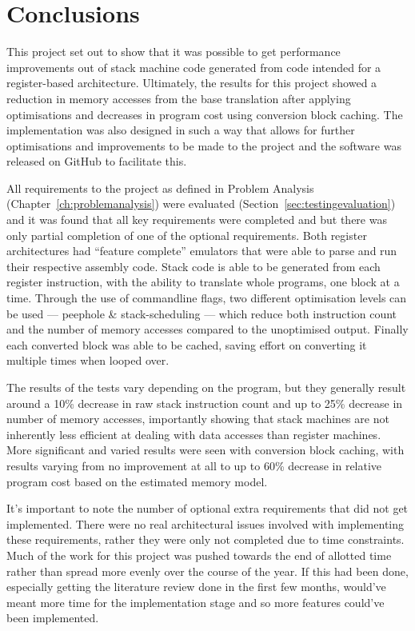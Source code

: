 \chapter{Conclusions}\label{ch:conclusions}
This project set out to show that it was possible to get performance
improvements out of stack machine code generated from code intended for a
register-based architecture. Ultimately, the results for this project showed a
reduction in memory accesses from the base translation after applying
optimisations and decreases in program cost using conversion block caching. The
implementation was also designed in such a way that allows for further
optimisations and improvements to be made to the project and the software was
released on GitHub to facilitate this.

All requirements to the project as defined in Problem Analysis
(Chapter~\ref{ch:problemanalysis}) were evaluated
(Section~\ref{sec:testingevaluation}) and it was found that all key requirements
were completed and but there was only partial completion of one of the optional
requirements. Both register architectures had ``feature complete'' emulators
that were able to parse and run their respective assembly code. Stack code is
able to be generated from each register instruction, with the ability to
translate whole programs, one block at a time. Through the use of commandline
flags, two different optimisation levels can be used --- peephole \&
stack-scheduling --- which reduce both instruction count and the number of
memory accesses compared to the unoptimised output.  Finally each converted
block was able to be cached, saving effort on converting it multiple times when
looped over.

The results of the tests vary depending on the program, but they generally
result around a 10\% decrease in raw stack instruction count and up to 25\%
decrease in number of memory accesses, importantly showing that stack machines
are not inherently less efficient at dealing with data accesses than register
machines. More significant and varied results were seen with conversion block
caching, with results varying from no improvement at all to up to 60\% decrease
in relative program cost based on the estimated memory model.

It's important to note the number of optional extra requirements that did not
get implemented. There were no real architectural issues involved with
implementing these requirements, rather they were only not completed due to time
constraints. Much of the work for this project was pushed towards the end of
allotted time rather than spread more evenly over the course of the year. If
this had been done, especially getting the literature review done in the first
few months, would've meant more time for the implementation stage and so more
features could've been implemented.

